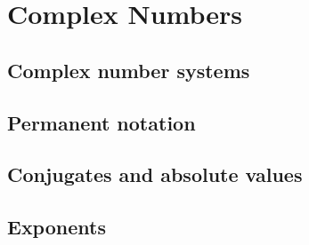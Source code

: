 \chapter{Complex Numbers}
\section{Complex number systems}
\section{Permanent notation}
\section{Conjugates and absolute values}
\section{Exponents}

